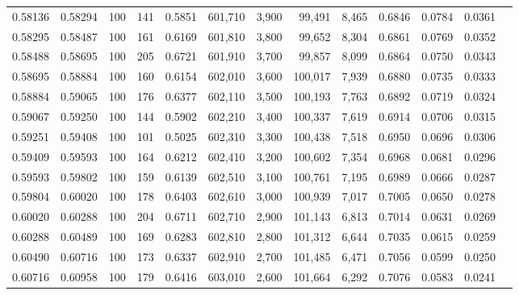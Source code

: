 \begin{tabular}{rrrrrrrrrrrrr}
0.58136 & 0.58294 &   100 & 141 &                                     0.5851 & 601,710 &   3,900 &  99,491 &   8,465 & 0.6846 & 0.0784 & 0.0361 \\
0.58295 & 0.58487 &   100 & 161 &                                     0.6169 & 601,810 &   3,800 &  99,652 &   8,304 & 0.6861 & 0.0769 & 0.0352 \\
0.58488 & 0.58695 &   100 & 205 &                                     0.6721 & 601,910 &   3,700 &  99,857 &   8,099 & 0.6864 & 0.0750 & 0.0343 \\
0.58695 & 0.58884 &   100 & 160 &                                     0.6154 & 602,010 &   3,600 & 100,017 &   7,939 & 0.6880 & 0.0735 & 0.0333 \\
0.58884 & 0.59065 &   100 & 176 &                                     0.6377 & 602,110 &   3,500 & 100,193 &   7,763 & 0.6892 & 0.0719 & 0.0324 \\
0.59067 & 0.59250 &   100 & 144 &                                     0.5902 & 602,210 &   3,400 & 100,337 &   7,619 & 0.6914 & 0.0706 & 0.0315 \\
0.59251 & 0.59408 &   100 & 101 &                                     0.5025 & 602,310 &   3,300 & 100,438 &   7,518 & 0.6950 & 0.0696 & 0.0306 \\
0.59409 & 0.59593 &   100 & 164 &                                     0.6212 & 602,410 &   3,200 & 100,602 &   7,354 & 0.6968 & 0.0681 & 0.0296 \\
0.59593 & 0.59802 &   100 & 159 &                                     0.6139 & 602,510 &   3,100 & 100,761 &   7,195 & 0.6989 & 0.0666 & 0.0287 \\
0.59804 & 0.60020 &   100 & 178 &                                     0.6403 & 602,610 &   3,000 & 100,939 &   7,017 & 0.7005 & 0.0650 & 0.0278 \\
0.60020 & 0.60288 &   100 & 204 &                                     0.6711 & 602,710 &   2,900 & 101,143 &   6,813 & 0.7014 & 0.0631 & 0.0269 \\
0.60288 & 0.60489 &   100 & 169 &                                     0.6283 & 602,810 &   2,800 & 101,312 &   6,644 & 0.7035 & 0.0615 & 0.0259 \\
0.60490 & 0.60716 &   100 & 173 &                                     0.6337 & 602,910 &   2,700 & 101,485 &   6,471 & 0.7056 & 0.0599 & 0.0250 \\
0.60716 & 0.60958 &   100 & 179 &                                     0.6416 & 603,010 &   2,600 & 101,664 &   6,292 & 0.7076 & 0.0583 & 0.0241 \\

\end{tabular}
